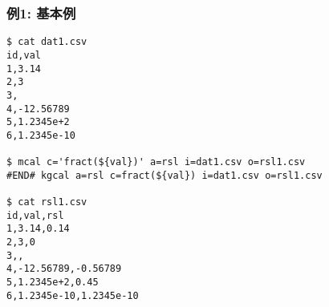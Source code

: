 
\subsubsection*{例1: 基本例}


\begin{Verbatim}[baselinestretch=0.7,frame=single]
$ cat dat1.csv
id,val
1,3.14
2,3
3,
4,-12.56789
5,1.2345e+2
6,1.2345e-10

$ mcal c='fract(${val})' a=rsl i=dat1.csv o=rsl1.csv
#END# kgcal a=rsl c=fract(${val}) i=dat1.csv o=rsl1.csv

$ cat rsl1.csv
id,val,rsl
1,3.14,0.14
2,3,0
3,,
4,-12.56789,-0.56789
5,1.2345e+2,0.45
6,1.2345e-10,1.2345e-10
\end{Verbatim}
